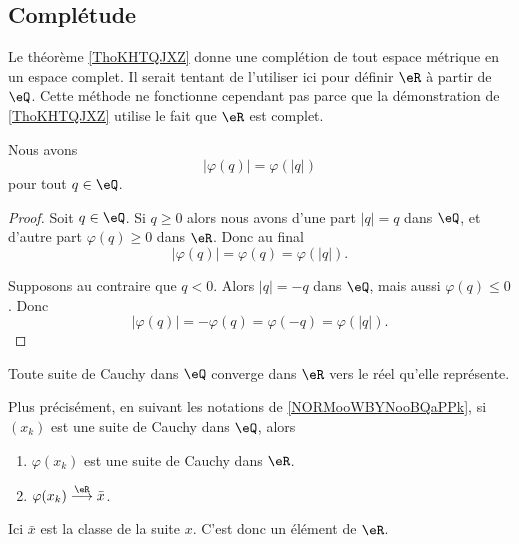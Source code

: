 \subsection{Complétude}

Le théorème \ref{ThoKHTQJXZ} donne une complétion de tout espace métrique en un espace complet. Il serait tentant de l'utiliser ici pour définir \( \eR\) à partir de \( \eQ\). Cette méthode ne fonctionne cependant pas parce que la démonstration de \ref{ThoKHTQJXZ} utilise le fait que \( \eR\) est complet.

\begin{lemma}       \label{LEMooXCVRooOSZYWv}
	Nous avons
	\begin{equation}
		| \varphi(q) |= \varphi(| q |)
	\end{equation}
	pour tout \( q\in \eQ\).
\end{lemma}

\begin{proof}
	Soit \( q\in \eQ\). Si \( q\geq 0\) alors nous avons d'une part \( | q |=q\) dans \( \eQ\), et d'autre part \( \varphi(q)\geq 0\) dans \( \eR\). Donc au final
	\begin{equation}
		| \varphi(q) |=\varphi(q)=\varphi(| q |).
	\end{equation}

	Supposons au contraire que \( q<0\). Alors \( | q |=-q\) dans \( \eQ\), mais aussi \( \varphi(q)\leq 0\). Donc
	\begin{equation}
		| \varphi(q) |=-\varphi(q)=\varphi(-q)=\varphi(| q |).
	\end{equation}
\end{proof}

\begin{lemma}      \label{LemooRTGFooYVstwS}
	Toute suite de Cauchy dans \( \eQ\) converge dans \( \eR\) vers le réel qu'elle représente.

	Plus précisément, en suivant les notations de \ref{NORMooWBYNooBQaPPk}, si \( (x_k)\) est une suite de Cauchy dans \( \eQ\), alors
	\begin{enumerate}
		\item
		      \( \varphi(x_k)\) est une suite de Cauchy dans \( \eR\).
		\item
		      \( \varphi(x_k)\stackrel{\eR}{\longrightarrow}\bar x\).
	\end{enumerate}
	Ici \( \bar x\) est la classe de la suite \( x\). C'est donc un élément de \( \eR\).
\end{lemma}


